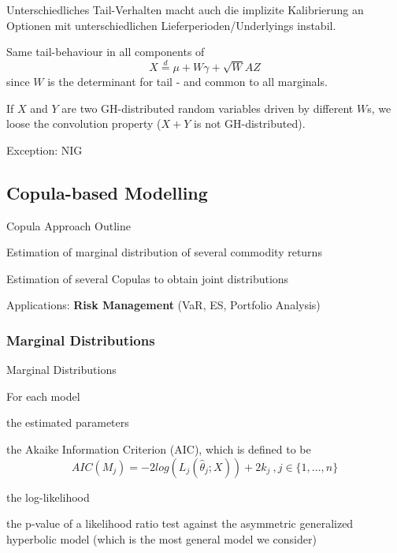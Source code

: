 %

	Unterschiedliches Tail-Verhalten macht auch die implizite Kalibrierung an Optionen mit unterschiedlichen Lieferperioden/Underlyings instabil.


	Same tail-behaviour in all components of
$$X\stackrel{d}{=}\mu+W\gamma+\sqrt{W}AZ$$
since $W$ is the determinant for tail - and common to all
marginals.

	If $X$ and $Y$ are two GH-distributed random
variables driven by different $W$s, we loose the convolution
property ($X+Y$ is not GH-distributed).

	Exception: NIG





\subsection{Copula-based Modelling}

{Copula Approach Outline} %






	Estimation of marginal  distribution of several commodity
returns

	Estimation of several Copulas to obtain joint
distributions

	Applications: \textbf{Risk Management} (VaR,
ES, Portfolio Analysis)





\subsubsection{Marginal Distributions}

{Marginal Distributions}

For each model






	the estimated parameters

	the Akaike Information
Criterion (AIC), which is defined to be
    \[AIC(M_j)=-2log(L_j(\hat{\theta}_j; X))+2k_j\ ,j\in\{1,\ldots,n\}\]


	the log-likelihood

	the p-value of a likelihood ratio
test against the asymmetric generalized hyperbolic model (which is
the most general model we consider)


